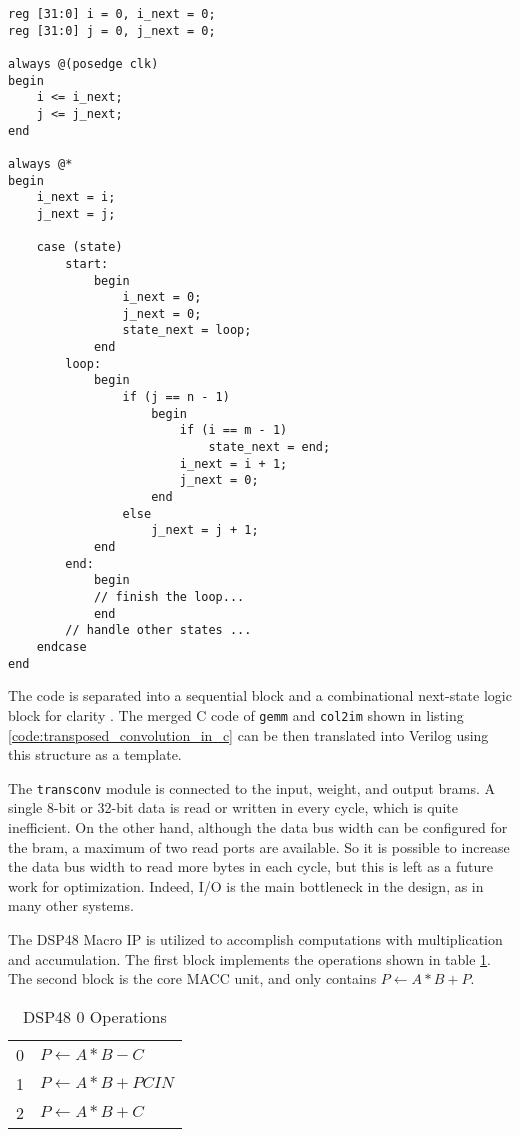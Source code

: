\begin{code}
\begin{verbatim}
reg [31:0] i = 0, i_next = 0;
reg [31:0] j = 0, j_next = 0;

always @(posedge clk)
begin
    i <= i_next;
    j <= j_next;
end

always @*
begin
    i_next = i;
    j_next = j;

    case (state)
        start:
            begin
                i_next = 0;
                j_next = 0;
                state_next = loop;
            end
        loop:
            begin
                if (j == n - 1)
                    begin
                        if (i == m - 1)
                            state_next = end;
                        i_next = i + 1;
                        j_next = 0;
                    end
                else
                    j_next = j + 1;
            end
        end:
            begin
            // finish the loop...
            end
        // handle other states ...
    endcase
end
\end{verbatim}
\label{code:simple_for_verilog}
\end{code}

The code is separated into a sequential block and a combinational next-state logic block for clarity
\cite{Chu-Verilog}.
The merged C code of \texttt{gemm} and \texttt{col2im} shown in listing
\ref{code:transposed_convolution_in_c} can be then translated into Verilog using this structure
as a template.

The \texttt{transconv} module is connected to the input, weight, and output \glspl{bram}. A single
8-bit or 32-bit data is read or written in every cycle, which is quite inefficient. On the other hand,
although the data bus width can be configured for the \gls{bram}, a maximum of two read ports are available.
So it is possible to increase the data bus width to read more bytes in each cycle, but this is left
as a future work for optimization. Indeed, I/O is the main bottleneck in the design, as in many other systems.

The DSP48 Macro IP is utilized to accomplish computations with multiplication and accumulation. The first
block implements the operations shown in table \ref{table:dsp48_0_operations}. The second block is the core
MACC unit, and only contains $P \leftarrow A*B+P$.

\begin{table}[h]
  \centering
  \caption{DSP48 0 Operations}
  \begin{tabular}{l | l}
    0 & $P \leftarrow A*B-C$ \\
    1 & $P \leftarrow A*B+PCIN$ \\
    2 & $P \leftarrow A*B+C$
  \end{tabular}
  \label{table:dsp48_0_operations}
\end{table}

